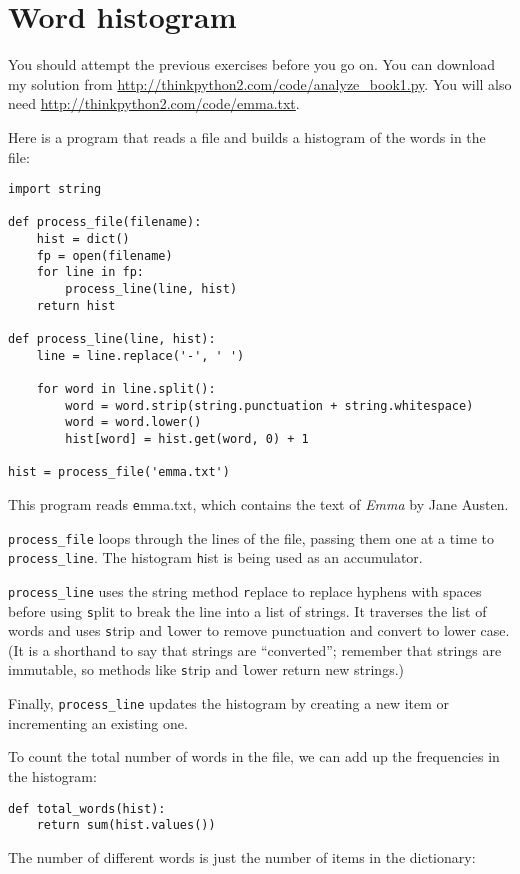 \documentclass[
DIV=11,
fontsize=12,
twoside,
headinclude=false,
titlepage=firstiscover,
abstract=true,
headsepline=true,
footsepline=true,
chapterprefix=true, %
headings=big,
bibliography=totoc,%
captions=tableheading
]{scrbook}
\theoremstyle{definition}
\begin{document}
\section{Word histogram}

You should attempt the previous exercises before you go on.
You can download my solution from
 \url{http://thinkpython2.com/code/analyze_book1.py}.  You will
also need \url{http://thinkpython2.com/code/emma.txt}.

Here is a program that reads a file and builds a histogram of the
words in the file:

\begin{lstlisting}
import string

def process_file(filename):
    hist = dict()
    fp = open(filename)
    for line in fp:
        process_line(line, hist)
    return hist

def process_line(line, hist):
    line = line.replace('-', ' ')
    
    for word in line.split():
        word = word.strip(string.punctuation + string.whitespace)
        word = word.lower()
        hist[word] = hist.get(word, 0) + 1

hist = process_file('emma.txt')
\end{lstlisting}
%
This program reads {\texttt emma.txt}, which contains the text of {\em
  Emma} by Jane Austen.

\verb"process_file" loops through the lines of the file,
passing them one at a time to \verb"process_line".  The histogram
{\texttt hist} is being used as an accumulator.

\verb"process_line" uses the string method {\texttt replace} to replace
hyphens with spaces before using {\texttt split} to break the line into a
list of strings.  It traverses the list of words and uses {\texttt strip}
and {\texttt lower} to remove punctuation and convert to lower case.  (It
is a shorthand to say that strings are ``converted''; remember that
strings are immutable, so methods like {\texttt strip} and {\texttt lower}
return new strings.)

Finally, \verb"process_line" updates the histogram by creating a new
item or incrementing an existing one.

To count the total number of words in the file, we can add up
the frequencies in the histogram:

\begin{lstlisting}
def total_words(hist):
    return sum(hist.values())
\end{lstlisting}
%
The number of different words is just the number of items in
the dictionary:
\end{document}
